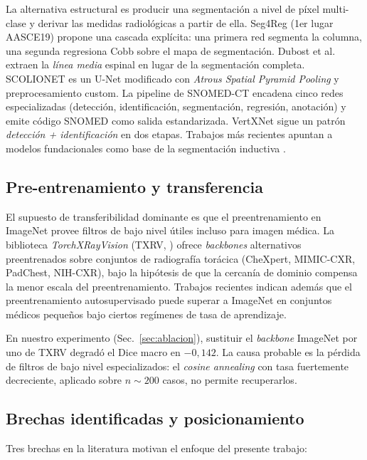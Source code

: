 \documentclass[conference]{IEEEtran}
\begin{document}
La alternativa estructural es producir una segmentación a nivel de píxel multi-clase y derivar las medidas radiológicas a partir de ella. Seg4Reg \cite{seg4reg} (1er lugar AASCE19) propone una cascada explícita: una primera red segmenta la columna, una segunda regresiona Cobb sobre el mapa de segmentación. Dubost et al.\ \cite{dubost} extraen la \emph{línea media} espinal en lugar de la segmentación completa. SCOLIONET \cite{scolionet} es un U-Net modificado con \emph{Atrous Spatial Pyramid Pooling} y preprocesamiento custom. La pipeline de SNOMED-CT \cite{snomed_pipe} encadena cinco redes especializadas (detección, identificación, segmentación, regresión, anotación) y emite código SNOMED como salida estandarizada. VertXNet \cite{vertxnet} sigue un patrón \emph{detección + identificación} en dos etapas. Trabajos más recientes apuntan a modelos fundacionales como base de la segmentación inductiva \cite{spinefm}.

\subsection{Pre-entrenamiento y transferencia}
\label{sec:soa-pretrain}

El supuesto de transferibilidad dominante es que el preentrenamiento en ImageNet provee filtros de bajo nivel útiles incluso para imagen médica. La biblioteca \emph{TorchXRayVision} (TXRV, \cite{txrv}) ofrece \emph{backbones} alternativos preentrenados sobre conjuntos de radiografía torácica (CheXpert, MIMIC-CXR, PadChest, NIH-CXR), bajo la hipótesis de que la cercanía de dominio compensa la menor escala del preentrenamiento. Trabajos recientes \cite{ssl_small} indican además que el preentrenamiento autosupervisado puede superar a ImageNet en conjuntos médicos pequeños bajo ciertos regímenes de tasa de aprendizaje.

En nuestro experimento (Sec.~\ref{sec:ablacion}), sustituir el \emph{backbone} ImageNet por uno de TXRV degradó el Dice macro en $-0{,}142$. La causa probable es la pérdida de filtros de bajo nivel especializados: el \emph{cosine annealing} con tasa fuertemente decreciente, aplicado sobre $n \sim 200$ casos, no permite recuperarlos.

\subsection{Brechas identificadas y posicionamiento}
\label{sec:soa-gaps}

Tres brechas en la literatura motivan el enfoque del presente trabajo:
\end{document}
